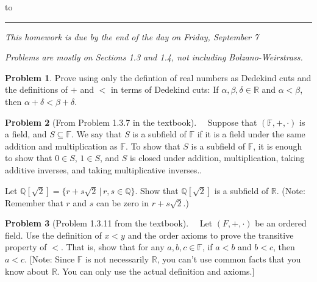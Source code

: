 \documentclass[12pt]{article}
\newcommand{\R}{{\mathbb R}}
\newcommand{\Q}{{\mathbb Q}}
\theoremstyle{definition}
\newtheorem{problem}{Problem}
\newenvironment{answer}{\par\medskip\bgroup\color{darkblue}}{\egroup\par\medskip}
\begin{document}
\hbox to 
\nointerlineskip
\vskip 2pt
\hrule height 1pt

\medskip

\centerline{\textit{This homework is due by the end of the day on Friday, September 7}}
\centerline{\textit{Problems are mostly on Sections 1.3 and 1.4, not including Bolzano-Weirstrass.}}

\bigskip

\def\F{{\mathbb F}}
\def\O{{\mathcal O}}

\begin{problem}
Prove using only the defintion of real numbers as Dedekind cuts and the definitions
of $+$ and $<$ in terms of Dedekind cuts:  If $\alpha,\beta,\delta\in\R$ and
$\alpha < \beta$, then $\alpha+\delta < \beta+\delta$.
\end{problem}

\begin{answer}
\end{answer}


\begin{problem}
[From Problem 1.3.7 in the textbook]\ \ 
Suppose that $(\F,+,\cdot)$ is a field, and $S\subseteq \F$. We say that $S$ is
a subfield of $\F$ if it is a field under the same addition and multiplication as $\F$.
To show that $S$ is a subfield of $\F$, it is enough to show that $0\in S$, $1\in S$,
and $S$ is closed under addition, multiplication, taking additive inverses, and
taking multiplicative inverses..

Let $\Q[\sqrt 2] = \{r+s\sqrt 2\,|\, r,s\in\Q\}$.  Show that $\Q[\sqrt 2]$ is
a subfield of $\R$.    (Note: Remember that $r$ and $s$ can be zero in $r+s\sqrt 2$.)
\end{problem}

\begin{answer}
\end{answer}


\begin{problem}
[Problem 1.3.11 from the textbook]\ \ Let $(F,+,\cdot)$ be an ordered field.  Use the
definition of $x<y$ and the order axioms to prove the
transitive property of $<$.  That is, show that for any $a,b,c\in\F$, if $a<b$ and $b<c$,
then $a<c$. [Note: Since $\F$ is not necessarily $\R$, you can't use common facts that you
know about $\R$.  You can only use the actual definition and axioms.]
\end{problem}
\end{document}
